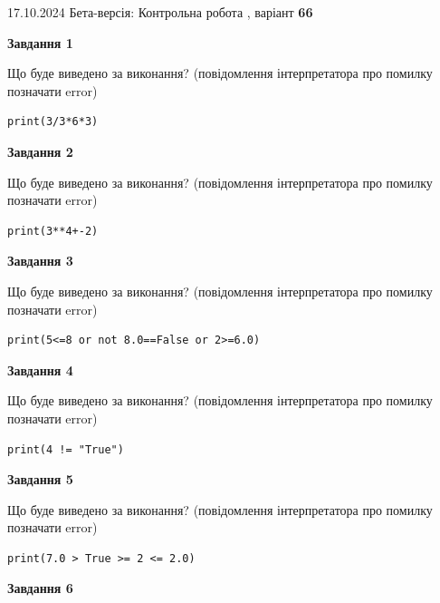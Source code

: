\documentclass[12pt, ukrainian]{article}
\begin{document}
{\Large{17.10.2024 Бета-версія: Контрольна робота , варіант  \No \textbf { 66 }\par}}
{
\begin {large}
{\begin {center}\textbf{Завдання 1}\end {center}}

Що буде виведено за виконання? (повідомлення інтерпретатора про помилку позначати error)\par
\begin{verbatim}
print(3/3*6*3)
\end{verbatim}

{\begin {center}\textbf{Завдання 2}\end {center}}

Що буде виведено за виконання? (повідомлення інтерпретатора про помилку позначати error)\par
\begin{verbatim}
print(3**4+-2)
\end{verbatim}

{\begin {center}\textbf{Завдання 3}\end {center}}

Що буде виведено за виконання? (повідомлення інтерпретатора про помилку позначати error)\par
\begin{verbatim}
print(5<=8 or not 8.0==False or 2>=6.0)
\end{verbatim}

{\begin {center}\textbf{Завдання 4}\end {center}}

Що буде виведено за виконання? (повідомлення інтерпретатора про помилку позначати error)\par
\begin{verbatim}
print(4 != "True")
\end{verbatim}

{\begin {center}\textbf{Завдання 5}\end {center}}

Що буде виведено за виконання? (повідомлення інтерпретатора про помилку позначати error)\par
\begin{verbatim}
print(7.0 > True >= 2 <= 2.0)
\end{verbatim}

{\begin {center}\textbf{Завдання 6}\end {center}}


\end{large}}
\end{document}
